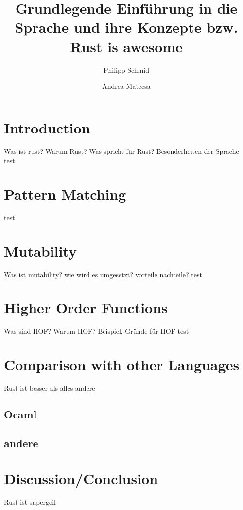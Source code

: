 \documentclass[a4paper,10pt]{scrartcl}
\title{Grundlegende Einführung in die Sprache und ihre Konzepte bzw. Rust is awesome}
\author{Philipp Schmid \and Andrea Matecsa}
\begin{document}
\maketitle
\tableofcontents
\section{Introduction} Was ist rust? Warum Rust? Was spricht für Rust? Besonderheiten der Sprache
test
\section{Pattern Matching}
test
\section{Mutability} Was ist mutability? wie wird es umgesetzt? vorteile nachteile?
test
\section{Higher Order Functions} Was sind HOF? Warum HOF? Beispiel, Gründe für HOF
test
\section{Comparison with other Languages}
Rust ist besser als alles andere
\subsection{Ocaml}
\subsection{andere}
\section{Discussion/Conclusion}
Rust ist supergeil
\end{document}
